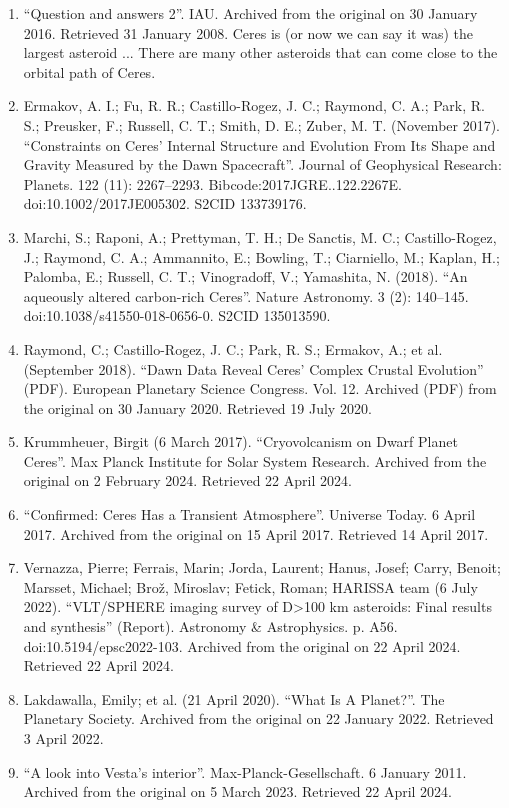 \begin{enumerate}
\item ``Question and answers 2''. IAU. Archived from the original on 30 January 2016. Retrieved 31 January 2008. Ceres is (or now we can say it was) the largest asteroid ... There are many other asteroids that can come close to the orbital path of Ceres.
\item Ermakov, A. I.; Fu, R. R.; Castillo-Rogez, J. C.; Raymond, C. A.; Park, R. S.; Preusker, F.; Russell, C. T.; Smith, D. E.; Zuber, M. T. (November 2017). ``Constraints on Ceres' Internal Structure and Evolution From Its Shape and Gravity Measured by the Dawn Spacecraft''. Journal of Geophysical Research: Planets. 122 (11): 2267–2293. Bibcode:2017JGRE..122.2267E. doi:10.1002/2017JE005302. S2CID 133739176.
\item Marchi, S.; Raponi, A.; Prettyman, T. H.; De Sanctis, M. C.; Castillo-Rogez, J.; Raymond, C. A.; Ammannito, E.; Bowling, T.; Ciarniello, M.; Kaplan, H.; Palomba, E.; Russell, C. T.; Vinogradoff, V.; Yamashita, N. (2018). ``An aqueously altered carbon-rich Ceres''. Nature Astronomy. 3 (2): 140–145. doi:10.1038/s41550-018-0656-0. S2CID 135013590.
\item Raymond, C.; Castillo-Rogez, J. C.; Park, R. S.; Ermakov, A.; et al. (September 2018). ``Dawn Data Reveal Ceres' Complex Crustal Evolution'' (PDF). European Planetary Science Congress. Vol. 12. Archived (PDF) from the original on 30 January 2020. Retrieved 19 July 2020.
\item Krummheuer, Birgit (6 March 2017). ``Cryovolcanism on Dwarf Planet Ceres''. Max Planck Institute for Solar System Research. Archived from the original on 2 February 2024. Retrieved 22 April 2024.
\item ``Confirmed: Ceres Has a Transient Atmosphere''. Universe Today. 6 April 2017. Archived from the original on 15 April 2017. Retrieved 14 April 2017.
\item Vernazza, Pierre; Ferrais, Marin; Jorda, Laurent; Hanus, Josef; Carry, Benoit; Marsset, Michael; Brož, Miroslav; Fetick, Roman; HARISSA team (6 July 2022). ``VLT/SPHERE imaging survey of D>100 km asteroids: Final results and synthesis'' (Report). Astronomy \& Astrophysics. p. A56. doi:10.5194/epsc2022-103. Archived from the original on 22 April 2024. Retrieved 22 April 2024.
\item Lakdawalla, Emily; et al. (21 April 2020). ``What Is A Planet?''. The Planetary Society. Archived from the original on 22 January 2022. Retrieved 3 April 2022.
\item ``A look into Vesta's interior''. Max-Planck-Gesellschaft. 6 January 2011. Archived from the original on 5 March 2023. Retrieved 22 April 2024.

\end{enumerate}
